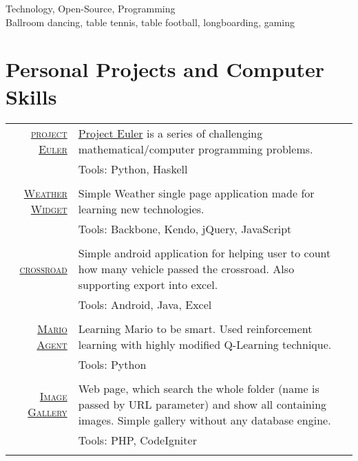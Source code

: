\documentclass[a4paper,10pt]{article} %
\begin{document}
Technology, Open-Source, Programming \\
Ballroom dancing, table tennis, table football, longboarding, gaming




\pagebreak


\section{Personal Projects and Computer Skills}

\begin{tabular}{rp{10cm}}
\href{https://github.com/majcn/projectEuler}{\textsc{project Euler}} & \href{https://projecteuler.net/}{Project Euler} is a series of challenging mathematical/computer programming problems. \\
& \footnotesize{Tools: Python, Haskell} \\
\\

\href{https://github.com/majcn/JavaScriptLearning}{\textsc{Weather Widget}} & Simple Weather single page application made for learning new technologies. \\
& \footnotesize{Tools: Backbone, Kendo, jQuery, JavaScript} \\
\\

\href{https://github.com/majcn/android-crossroad}{\textsc{crossroad}} & Simple android application for helping user to count how many vehicle passed the crossroad. Also supporting export into excel. \\
& \footnotesize{Tools: Android, Java, Excel} \\
\\

\href{https://github.com/majcn/MarioAgent}{\textsc{Mario Agent}} & Learning Mario to be smart. Used reinforcement learning with highly modified Q-Learning technique. \\
& \footnotesize{Tools: Python} \\
\\

\href{https://github.com/majcn/imageGallery}{\textsc{Image Gallery}} & Web page, which search the whole folder (name is passed by URL parameter) and show all containing images. Simple gallery without any database engine. \\
& \footnotesize{Tools: PHP, CodeIgniter} \\
\\


\end{tabular}
\end{document}
